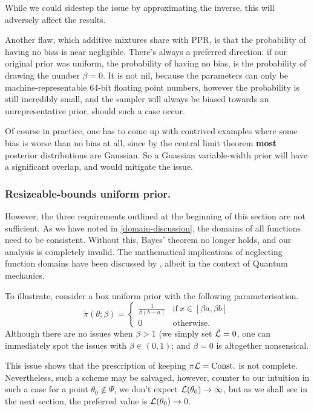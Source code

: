 \documentclass[usenatbib]{mnras}
\begin{document}
While we could sidestep the issue by approximating the inverse,
this will adversely affect the results.

Another flaw, which additive mixtures share with PPR, is that the
probability of having no bias is near negligible. There's always a
preferred direction: if our original prior was uniform, the
probability of having no bias, is the probability of drawing the
number \(\beta=0\). It is not nil, because the parameters can only
be machine-representable 64-bit floating point numbers, however
the probability is still incredibly small, and the sampler will
always be biased towards an unrepresentative prior, should such a
case occur.

Of course in practice, one has to come up with contrived examples
where some bias is worse than no bias at all, since by the central
limit theorem \textbf{most} posterior distributions are Gaussian. So a
Guassian variable-width prior will have a significant overlap, and
would mitigate the issue.

\subsubsection{Resizeable-bounds uniform prior.}
\label{sec:org4f1c33b}

However, the three requirements outlined at the beginning of this
section are not sufficient. As we have noted in
\autoref{domain-discussion}, the domains of all functions need to be
consistent. Without this, Bayes' theorem no longer holds, and our
analysis is completely invalid. The mathematical implications of
neglecting function domains have been discussed by
\cite{Gieres_2000}, albeit in the context of Quantum mechanics.  

To illustrate, consider a box uniform prior
with the following parameterisation.
\begin{equation}
  \tilde{\pi}(\theta; \beta) =
  \begin{cases}
	\frac{1}{\beta(b-a)} & \text{if}\ x \in [\beta a, \beta b] \\
	0 & \text{otherwise}.
  \end{cases}
\end{equation}
Although there are no issues when \(\beta>1\) (we simply set \({\cal
	\tilde{L}}=0\), one can immediately spot the issues with \(\beta \in (0,1)\);
and \(\beta=0\) is altogether nonsensical.

This issue shows that the prescription of keeping \(\pi {\cal L} =
	\text{Const.}\) is not complete. Nevertheless, such a scheme may be
salvaged, however, counter to our intuition in such a case for a
point \(\theta_{0} \notin \Psi\), we don't expect \({\cal L}(\theta_{0})
	\rightarrow \infty\), but as we shall see in the next section, the preferred value
is \({\cal L}(\theta_{0}) \rightarrow 0\).
\end{document}
